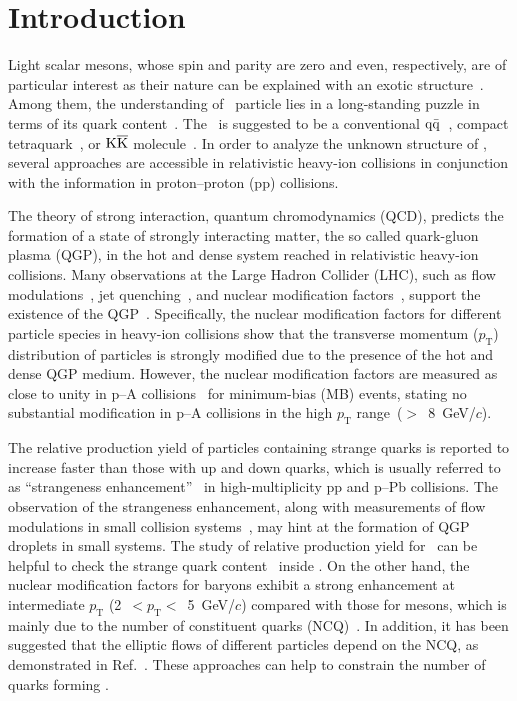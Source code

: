 
\section{Introduction}

Light scalar mesons, whose spin and parity are zero and even, respectively, are of particular interest as their nature can be explained with an exotic structure~\cite{ParticleDataGroup:2022pth}. Among them, the understanding of \fzero\ particle lies in a long-standing puzzle in terms of its quark content~\cite{ExHIC:2010gcb, Jaffe:1976ig, Maiani:2004uc}. The \fzero\ is suggested to be a conventional $\rm{}q\bar{q}$~\cite{Chen:2003za}, compact tetraquark~\cite{Achasov:2020aun}, or $\rm{}K\overline{K}$ molecule~\cite{Ahmed:2020kmp}. In order to analyze the unknown structure of \fzero, several approaches are accessible in relativistic heavy-ion collisions in conjunction with the information in proton--proton (pp) collisions. 

The theory of strong interaction, quantum chromodynamics (QCD), predicts the formation of a state of strongly interacting matter, the so called quark-gluon plasma (QGP), in the hot and dense system reached in relativistic heavy-ion collisions. Many observations at the Large Hadron Collider (LHC), such as flow modulations~\cite{Bhalerao:2020ulk, ALICE:2019zfl}, jet quenching~\cite{ALICE:2019qyj}, and nuclear modification factors~\cite{ALICE:2019hno}, support the existence of the QGP~\cite{Adams:2005dq}. Specifically, the nuclear modification factors for different particle species in heavy-ion collisions show that the transverse momentum ($p_{\mathrm{T}}$) distribution of particles is strongly modified due to the presence of the hot and dense QGP medium. However, the nuclear modification factors are measured as close to unity in p--A collisions~\cite{ALICE:2016dei} for minimum-bias (MB) events, stating no substantial modification in p--A collisions in the high $p_{\mathrm{T}}$ range~($>$~8~GeV/$c$). 

The relative production yield of particles containing strange quarks is reported to increase faster than those with up and down quarks, which is usually referred to as ``strangeness enhancement''~\cite{ALICE:2016fzo} in high-multiplicity pp and p--Pb collisions. The observation of the strangeness enhancement, along with measurements of flow modulations in small collision systems~\cite{PHENIX:2018lia, ALICE:2021nir}, may hint at the formation of QGP droplets in small systems. The study of relative production yield for \fzero\ can be helpful to check the strange quark content~\cite{LHCb:2014ooi, LHCb:2014vbo} inside \fzero. On the other hand, the nuclear modification factors for baryons exhibit a strong enhancement at intermediate $p_{\mathrm{T}}$ (2~$<p_{\mathrm{T}}<$~5~GeV/$c$) compared with those for mesons, which is mainly due to the number of constituent quarks (NCQ)~\cite{Cronin:1974zm, Fries:2003vb}. In addition, it has been suggested that the elliptic flows of different particles depend on the NCQ, as demonstrated in Ref.~\cite{Wang:2022det}. These approaches can help to constrain the number of quarks forming \fzero.

